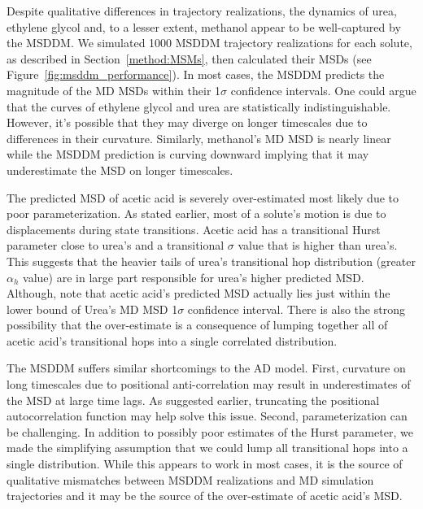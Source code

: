 \documentclass[12pt]{article}
\begin{document}
  Despite qualitative differences in trajectory realizations, the dynamics of 
  urea, ethylene glycol and, to a lesser extent, methanol appear to be well-captured
  by the MSDDM. We simulated 1000 MSDDM trajectory realizations for each solute, as
  described in Section~\ref{method:MSMs}, then calculated their MSDs (see 
  Figure~\ref{fig:msddm_performance}). In most cases, the MSDDM predicts the magnitude of the MD MSDs 
  within their 1$\sigma$ confidence intervals. One could argue that the curves
  of ethylene glycol and urea are statistically indistinguishable. However, 
  it's possible that they may diverge on longer timescales due to differences
  in their curvature. Similarly, methanol's MD MSD is nearly linear while 
  the MSDDM prediction is curving downward implying that it may underestimate
  the MSD on longer timescales. 
  
  The predicted MSD of acetic acid is severely over-estimated most likely due
  to poor parameterization. 
As stated earlier, most of a solute's motion is 
  due to displacements during state transitions. Acetic acid has a transitional
  Hurst parameter close to urea's and a transitional $\sigma$ value that 
  is higher than urea's. This suggests that the heavier tails of urea's transitional
  hop distribution (greater $\alpha_h$ value) are in large part responsible for 
  urea's higher predicted MSD. Although, note that acetic acid's predicted MSD
  actually lies just within the lower bound of Urea's MD MSD 1$\sigma$ 
  confidence interval. There is also the strong possibility that the over-estimate is
  a consequence of lumping together all of acetic acid's transitional hops into
  a single correlated distribution.
  
  The MSDDM suffers similar shortcomings to the AD model. First, curvature 
  on long timescales due to positional anti-correlation may result in 
  underestimates of the MSD at large time lags. As suggested earlier, truncating
  the positional autocorrelation function may help solve this issue. Second, 
  parameterization can be challenging. In addition to possibly poor estimates 
  of the Hurst parameter, we made the simplifying assumption that we could lump
  all transitional hops into a single distribution. While this appears to work
  in most cases, it is the source of qualitative mismatches between MSDDM
  realizations and MD simulation trajectories and it may be the source of the 
  over-estimate of acetic acid's MSD.
  
\end{document}
